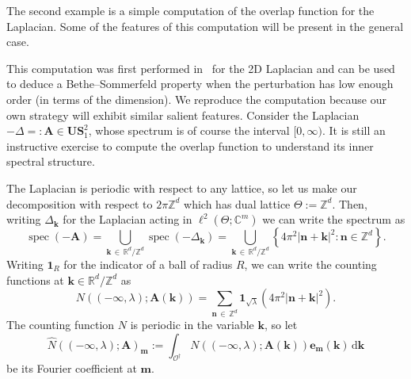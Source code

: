 \documentclass[10pt]{amsart}
\theoremstyle{definition}\newtheorem{defi}[theo]{Definition}\newtheorem{rema}[theo]{Remark}\newtheorem{exam}[theo]{Example}\newtheorem{nota}[theo]{Notation}
\DeclareMathOperator{\spec}{spec}
\newcommand{\de}{\, \mathrm{d}}
\newcommand{\R}{\mathbb R}
\newcommand{\C}{\mathbb C}
\newcommand{\Z}{\mathbb Z}
\newcommand{\CO}{\mathcal{O}}
\newcommand{\bone}{\boldsymbol 1}
\newcommand{\BA}{\mathbf A}
\newcommand{\BS}{\mathbf S}
\newcommand{\BU}{\mathbf U}
\newcommand{\be}{\mathbf e}
\newcommand{\bk}{\mathbf k}
\newcommand{\bm}{\mathbf m}
\newcommand{\bn}{\mathbf n}
\newcommand{\abs}[1]{\left\lvert #1 \right\rvert}
\newcommand{\set}[1]{\left\{ #1 \right\}}
\begin{document}
The second example is a simple computation of the overlap function for the Laplacian. Some of the features of this computation will be present in the general case.
\begin{exem}\label{ex:heuristic}
This computation was first performed in~\cite{dahlbergtrubowitz} for the 2D Laplacian and can be used to deduce a Bethe--Sommerfeld property when the perturbation has low enough order (in terms of the dimension). We reproduce the computation because our own strategy will exhibit similar salient features. Consider the Laplacian $-\Delta =: \BA \in \BU\BS_1^2$, whose spectrum is of course the interval $[0,\infty)$. It is still an instructive exercise to compute the overlap function to understand its inner spectral structure.

The Laplacian is periodic with respect to any lattice, so let us make our decomposition with respect to $2\pi\Z^d$ which has dual lattice $\Theta := \Z^d$. Then, writing $\Delta_\bk$ for the Laplacian acting in $\ell^2(\Theta;\C^m)$ we can write the spectrum as
\begin{equation}
\spec(-\BA) =
\bigcup_{\bk\,\in\,\R^d/\Z^d} \spec(-\Delta_\bk) = \bigcup_{\bk\,\in\,\R^d/\Z^d} \set{4\pi^2|\bn + \bk|^2 : \bn
\in \Z^d}.
\end{equation}
Writing $\bone_R$ for the indicator of a ball of radius $R$, we can write the counting functions at $\bk \in \R^d/\Z^d$ as
\begin{equation}
N((-\infty,\lambda);\BA(\bk)) = \sum_{\bn \,\in\,\Z^d}
\bone_{\sqrt{\lambda}}\left(4\pi^2 \abs{\bn + \bk}^2\right).
\end{equation}
The counting function $N$ is periodic in the variable $\bk$, so let
\begin{equation}
\widehat N((-\infty,\lambda);\BA)_\bm := \int_{\CO^\dagger} N((-\infty,\lambda);\BA(\bk)) \be_\bm(\bk) \de \bk
\end{equation}
be its Fourier coefficient at $\bm$.


\end{exem}
\end{document}
